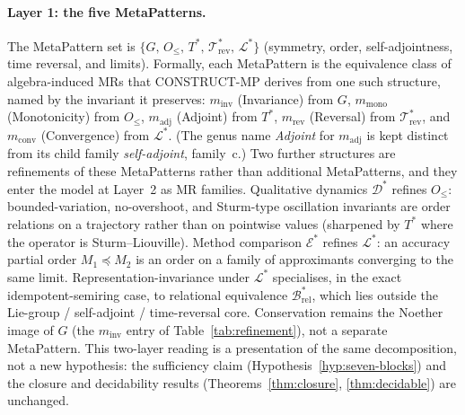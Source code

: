 \documentclass[acmsmall,screen,review]{acmart}
\begin{document}
\paragraph{Layer 1: the five MetaPatterns.} The MetaPattern set is $\{G,\,O_{\le},\,T^{*},\,\mathcal{T}^{*}_{\mathrm{rev}},\,\mathcal{L}^{*}\}$ (symmetry, order, self-adjointness, time reversal, and limits). Formally, each MetaPattern is the equivalence class of algebra-induced MRs that CONSTRUCT-MP derives from one such structure, named by the invariant it preserves: $m_{\mathrm{inv}}$ (Invariance) from $G$, $m_{\mathrm{mono}}$ (Monotonicity) from $O_{\le}$, $m_{\mathrm{adj}}$ (Adjoint) from $T^{*}$, $m_{\mathrm{rev}}$ (Reversal) from $\mathcal{T}^{*}_{\mathrm{rev}}$, and $m_{\mathrm{conv}}$ (Convergence) from $\mathcal{L}^{*}$. (The genus name \emph{Adjoint} for $m_{\mathrm{adj}}$ is kept distinct from its child family \emph{self-adjoint}, family~c.) Two further structures are refinements of these MetaPatterns rather than additional MetaPatterns, and they enter the model at Layer~2 as MR families. Qualitative dynamics $\mathcal{D}^{*}$ refines $O_{\le}$: bounded-variation, no-overshoot, and Sturm-type oscillation invariants are order relations on a trajectory rather than on pointwise values (sharpened by $T^{*}$ where the operator is Sturm--Liouville). Method comparison $\mathcal{E}^{*}$ refines $\mathcal{L}^{*}$: an accuracy partial order $M_1 \preceq M_2$ is an order on a family of approximants converging to the same limit. Representation-invariance under $\mathcal{L}^{*}$ specialises, in the exact idempotent-semiring case, to relational equivalence $\mathcal{B}^{*}_{\mathrm{rel}}$, which lies outside the Lie-group / self-adjoint / time-reversal core. Conservation remains the Noether image of $G$ (the $m_{\mathrm{inv}}$ entry of Table~\ref{tab:refinement}), not a separate MetaPattern. This two-layer reading is a presentation of the same decomposition, not a new hypothesis: the sufficiency claim (Hypothesis~\ref{hyp:seven-blocks}) and the closure and decidability results (Theorems~\ref{thm:closure}, \ref{thm:decidable}) are unchanged.
\end{document}
